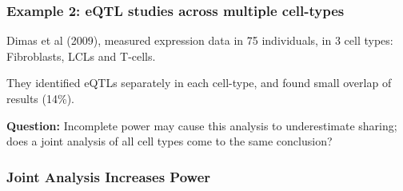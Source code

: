 \documentclass[ignorenonframetext]{beamer}
\begin{document}




\begin{frame}
\frametitle{Example 2: eQTL studies across multiple cell-types}
 
Dimas et al (2009), measured expression data in 75 individuals, in 3 cell types: Fibroblasts, LCLs and T-cells.

\bigskip
 
They identified eQTLs separately in each cell-type, and found small overlap of results (14\%).

\bigskip
 
{\bf Question:} Incomplete power may cause this analysis to underestimate sharing; does a joint analysis of all cell types
 come to the same conclusion?


\end{frame}


\begin{frame}
\frametitle{Joint Analysis Increases Power}
\begin{center}
\end{center}
\end{frame}
\end{document}
